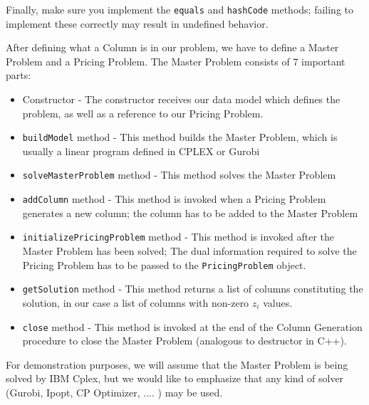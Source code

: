 \documentclass[a4paper]{article}
\newcommand{\code}[1]{\lstinline[language=java, style=seminar]!#1!}
\begin{document}
Finally, make sure you implement the \code{equals} and \code{hashCode} methods; failing to implement these correctly may result in undefined behavior.

After defining what a Column is in our problem, we have to define a Master Problem and a Pricing Problem. The Master Problem consists of 7 important parts:
\begin{itemize}[nolistsep]
 \item Constructor - The constructor receives our data model which defines the problem, as well as a reference to our Pricing Problem.
 \item \code{buildModel} method - This method builds the Master Problem, which is usually a linear program defined in CPLEX or Gurobi
 \item \code{solveMasterProblem} method - This method solves the Master Problem
 \item \code{addColumn} method - This method is invoked when a Pricing Problem generates a new column; the column has to be added to the Master Problem
 \item \code{initializePricingProblem} method - This method is invoked after the Master Problem has been solved; The dual information required to solve the Pricing Problem has to be passed to the \code{PricingProblem} object.
 \item \code{getSolution} method - This method returns a list of columns constituting the solution, in our case a list of columns with non-zero $z_i$ values.
 \item \code{close} method - This method is invoked at the end of the Column Generation procedure to close the Master Problem (analogous to destructor in C++).
\end{itemize}
For demonstration purposes, we will assume that the Master Problem is being solved by IBM Cplex, but we would like to emphasize that any kind of solver (Gurobi, Ipopt, CP Optimizer, .... ) may be used.
\end{document}
